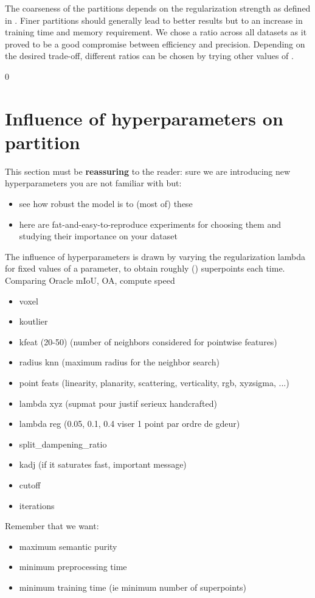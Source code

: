 The coarseness of the partitions depends on the regularization strength  as defined in .
Finer partitions should generally lead to better results but to an increase in training time and memory requirement. We chose a ratio  across all datasets as it proved to be a good compromise between efficiency and precision. Depending on the desired trade-off, different ratios can be chosen by trying other values of .

 
 0
\section{Influence of hyperparameters on partition}
This section must be \textbf{reassuring} to the reader: sure we are introducing new hyperparameters you are not familiar with but:
\begin{itemize}
    \item see how robust the model is to (most of) these
    \item here are fat-and-easy-to-reproduce experiments for choosing them and studying their importance on your dataset
\end{itemize}

The influence of hyperparameters is drawn by varying the regularization lambda for fixed values of a parameter, to obtain roughly () superpoints each time. Comparing Oracle mIoU, OA, compute speed 
\begin{itemize}
    \item voxel
    \item koutlier
    \item kfeat (20-50) (number of neighbors considered for pointwise features)
    \item radius knn (maximum radius for the neighbor search) 
    \item point feats (linearity, planarity, scattering, verticality, rgb, xyz\/sigma, ...)
    \item lambda xyz (supmat pour justif serieux handcrafted)
    \item lambda reg (0.05, 0.1, 0.4 viser 1 point par ordre de gdeur)
    \item split\_dampening\_ratio
    \item kadj (if it saturates fast, important message)
    \item cutoff 
    \item iterations
\end{itemize}

Remember that we want:
\begin{itemize}
    \item maximum semantic purity
    \item minimum preprocessing time
    \item minimum training time (ie minimum number of superpoints)
\end{itemize}
\fi 

